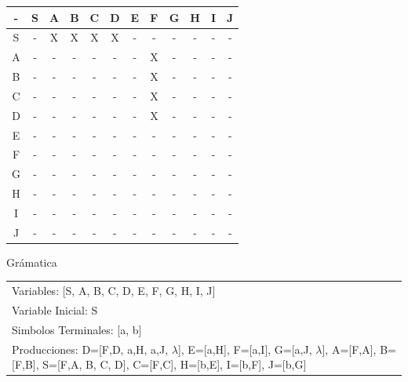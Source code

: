 \documentclass[a4paper,11pt]{article}
\newcommand{\MYp}[1]{ {\color[rgb]{0.392,0.392,0.392}#1} }
\begin{document}
\begin{center}
\begin{tabular}{||c||c||c||c||c||c||c||c||c||c||c||c||}
\hline
\hline
  -  & S & A & B & C & D & E & F & G & H & I & J \\ 
\hline
\hline
 S  &  -  &  X  &  X  &  X  &  X  &  -  &  -  &  -  &  -  &  -  &  -  \\ 
\hline
\hline
 A  &  -  &  -  &  -  &  -  &  -  &  -  &  X  &  -  &  -  &  -  &  -  \\ 
\hline
\hline
 B  &  -  &  -  &  -  &  -  &  -  &  -  &  X  &  -  &  -  &  -  &  -  \\ 
\hline
\hline
 C  &  -  &  -  &  -  &  -  &  -  &  -  &  X  &  -  &  -  &  -  &  -  \\ 
\hline
\hline
 D  &  -  &  -  &  -  &  -  &  -  &  -  &  X  &  -  &  -  &  -  &  -  \\ 
\hline
\hline
 E  &  -  &  -  &  -  &  -  &  -  &  -  &  -  &  -  &  -  &  -  &  -  \\ 
\hline
\hline
 F  &  -  &  -  &  -  &  -  &  -  &  -  &  -  &  -  &  -  &  -  &  -  \\ 
\hline
\hline
 G  &  -  &  -  &  -  &  -  &  -  &  -  &  -  &  -  &  -  &  -  &  -  \\ 
\hline
\hline
 H  &  -  &  -  &  -  &  -  &  -  &  -  &  -  &  -  &  -  &  -  &  -  \\ 
\hline
\hline
 I  &  -  &  -  &  -  &  -  &  -  &  -  &  -  &  -  &  -  &  -  &  -  \\ 
\hline
\hline
 J  &  -  &  -  &  -  &  -  &  -  &  -  &  -  &  -  &  -  &  -  &  -  \\ 
\hline
\hline
\end{tabular}
\end{center}
\MYp{\Huge Gr\'amatica}
\newline
\begin{center}\begin{tabular}{ m{15cm} }


Variables: [S, A, B, C, D, E, F, G, H, I, J] \\
Variable Inicial: S \\
Simbolos Terminales: [a, b] \\
Producciones: {D=[F,D, a,H, a,J, $\lambda$], E=[a,H], F=[a,I], G=[a,J, $\lambda$], A=[F,A], B=[F,B], S=[F,A, B, C, D], C=[F,C], H=[b,E], I=[b,F], J=[b,G]} \\

\end{tabular}
\end{center}
\end{document}
